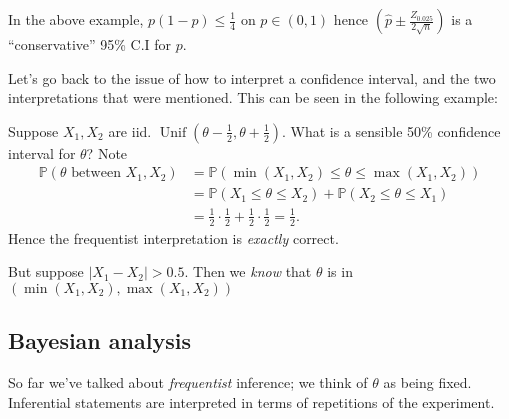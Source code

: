 \documentclass[egregdoesnotlikesansseriftitles,a4paper]{scrartcl}
\begin{document}
\begin{remark}
      In the above example, $p (1-p)\leq \frac{1}{4}$ on $p \in (0,1)$ hence $(\hat{p} \pm \frac{Z_{0.025}}{2 \sqrt{n}})$ is a ``conservative'' 95\% C.I for $p$.
\end{remark}
Let's go back to the issue of how to interpret a confidence interval, and the two interpretations that were mentioned. This can be seen in the following example:
\begin{example*}
      Suppose $X_1 ,X_2 $ are iid. $\operatorname{Unif}(\theta-\frac{1}{2}, \theta+\frac{1}{2})$. What is a sensible 50\% confidence interval for $\theta$? Note 
      \begin{align*}
           \mathbb{P} (\theta \text{ between }X_1 ,X_2  )&= \mathbb{P} (\min (X_1 ,X_2 ) \leq \theta \leq \max (X_1 , X_2 ))\\
           &=\mathbb{P} (X_1 \leq \theta \leq X_2 )+\mathbb{P} (X_2 \leq \theta \leq X_1 )\\
           &=\frac{1}{2} \cdot \frac{1}{2} + \frac{1}{2} \cdot \frac{1}{2} =\frac{1}{2}.
      \end{align*}
      Hence the frequentist interpretation is \emph{exactly} correct.

      But suppose $\left|X_1 -X_2 \right|>0.5$. Then we \emph{know} that $\theta$ is in $(\min (X_1 ,X_2 ) , \max (X_1 , X_2 ))$ 
\end{example*}
\subsection{Bayesian analysis}
So far we've talked about \emph{frequentist} inference; we think of $\theta $ as being fixed. Inferential statements are interpreted in terms of repetitions of the experiment. 
\end{document}
